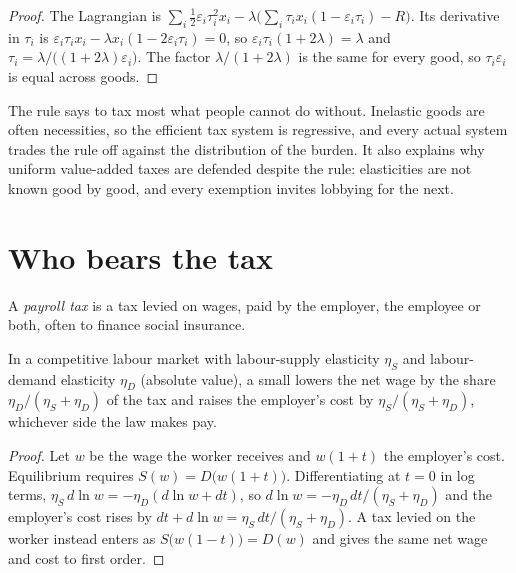 \begin{proof}
The Lagrangian is $\sum_i \tfrac12\varepsilon_i\tau_i^2x_i - \lambda\big(\sum_i \tau_ix_i(1 - \varepsilon_i\tau_i) - R\big)$. Its derivative in $\tau_i$ is
$\varepsilon_i\tau_ix_i - \lambda x_i(1 - 2\varepsilon_i\tau_i) = 0$, so $\varepsilon_i\tau_i(1 + 2\lambda) = \lambda$ and $\tau_i = \lambda/\big((1 + 2\lambda)\varepsilon_i\big)$. The
factor $\lambda/(1 + 2\lambda)$ is the same for every good, so $\tau_i\varepsilon_i$ is equal across goods.
\end{proof}

The rule says to tax most what people cannot do without. Inelastic goods are often
necessities, so the efficient tax system is regressive, and every actual system
trades the rule off against the distribution of the burden. It also explains why
uniform value-added taxes are defended despite the rule: elasticities are not known
good by good, and every exemption invites lobbying for the next.

\section{Who bears the tax}\label{sec:b3:efficiency-cost-of-taxation:incidence}

\begin{definition}\label{def:b3:efficiency-cost-of-taxation:payroll-tax}
A \emph{payroll tax} is a tax levied on wages, paid by the employer, the employee or
both, often to finance social insurance.
\end{definition}

\begin{proposition}\label{prop:b3:efficiency-cost-of-taxation:payroll}
In a competitive labour market with labour-supply elasticity $\eta_S$ and labour-demand
elasticity $\eta_D$ (absolute value), a small  lowers the net wage by the
share $\eta_D/(\eta_S + \eta_D)$ of the tax and raises the employer's cost by $\eta_S/(\eta_S + \eta_D)$, whichever
side the law makes pay.
\end{proposition}

\begin{proof}
Let $w$ be the wage the worker receives and $w(1 + t)$ the employer's cost. Equilibrium
requires $S(w) = D\big(w(1 + t)\big)$. Differentiating at $t = 0$ in log terms, $\eta_S\,d\ln w = -\eta_D(d\ln w + dt)$, so
$d\ln w = -\eta_D\,dt/(\eta_S + \eta_D)$ and the employer's cost rises by $dt + d\ln w = \eta_S\,dt/(\eta_S + \eta_D)$. A tax
levied on the worker instead enters as $S\big(w(1 - t)\big) = D(w)$ and gives the same net wage
and cost to first order.
\end{proof}

